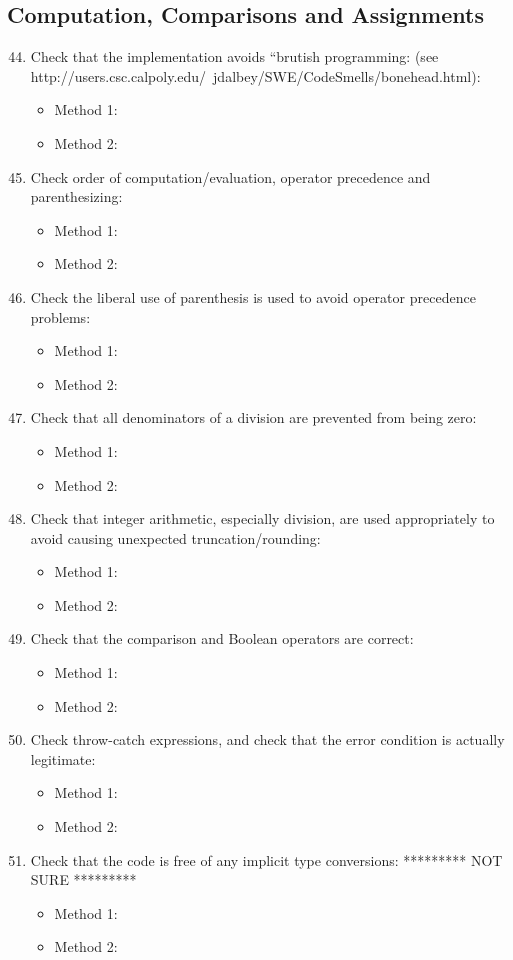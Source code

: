 \subsection{Computation, Comparisons and Assignments}
\begin{enumerate}
	\setcounter{enumi}{43}
	\item Check that the implementation avoids “brutish programming: (see http://users.csc.calpoly.edu/~jdalbey/SWE/CodeSmells/bonehead.html):
	\begin{itemize}
		\item Method 1: 
		\item Method 2:
	\end{itemize}
	\item Check order of computation/evaluation, operator precedence and parenthesizing:
	\begin{itemize}
		\item Method 1: 
		\item Method 2:
	\end{itemize}
	\item Check the liberal use of parenthesis is used to avoid operator precedence problems:
	\begin{itemize}
		\item Method 1: 
		\item Method 2: 
	\end{itemize}
	\item Check that all denominators of a division are prevented from being zero:
	\begin{itemize}
		\item Method 1: 
		\item Method 2:
	\end{itemize}
	\item Check that integer arithmetic, especially division, are used appropriately to avoid causing unexpected truncation/rounding:
	\begin{itemize}
		\item Method 1: 
		\item Method 2:
	\end{itemize}
	\item Check that the comparison and Boolean operators are correct:
	\begin{itemize}
		\item Method 1: 
		\item Method 2: 
	\end{itemize}
	\item Check throw-catch expressions, and check that the error condition is actually legitimate:
	\begin{itemize}
		\item Method 1: \cmark
		\item Method 2: 
	\end{itemize}
	\item Check that the code is free of any implicit type conversions: ********* NOT SURE *********
	\begin{itemize}
		\item Method 1: 
		\item Method 2: 
	\end{itemize}
\end{enumerate}